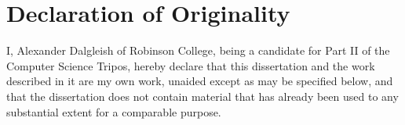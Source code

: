 \documentclass[diss.tex]{subfiles}
\begin{document}
\chapter*{Declaration of Originality}

I, Alexander Dalgleish of Robinson College, being a candidate for Part II of the Computer Science Tripos, hereby declare that this dissertation and the work described in it are my own work, unaided except as may be specified below, and that the dissertation does not contain material that has already been used to any substantial extent for a comparable purpose.
\end{document}

